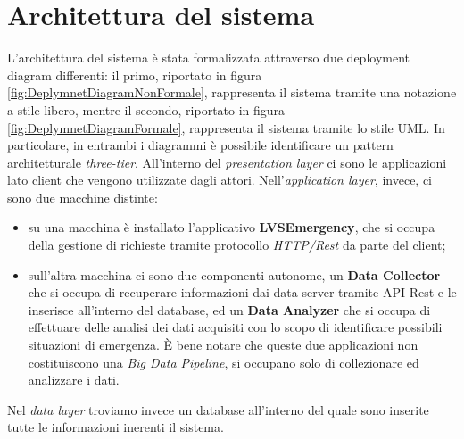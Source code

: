 \clearpage
\section{Architettura del sistema}
L'architettura del sistema è stata formalizzata attraverso due deployment diagram differenti: il primo, riportato in figura \ref{fig:DeplymnetDiagramNonFormale}, rappresenta il sistema tramite una notazione a stile libero, mentre il secondo, riportato in figura \ref{fig:DeplymnetDiagramFormale}, rappresenta il sistema tramite lo stile UML. In particolare, in entrambi i diagrammi è possibile identificare un pattern architetturale \textit{three-tier}. All'interno del \textit{presentation layer} ci sono le applicazioni lato client che vengono utilizzate dagli attori. Nell'\textit{application layer}, invece, ci sono due macchine distinte:

\begin{itemize}
	\item su una macchina è installato l'applicativo \textbf{LVSEmergency}, che si occupa della gestione di richieste tramite protocollo \textit{HTTP/Rest} da parte del client;
	\item sull'altra macchina ci sono due componenti autonome, un \textbf{Data Collector} che si occupa di recuperare informazioni dai data server tramite API Rest e le inserisce all'interno del database, ed un \textbf{Data Analyzer} che si occupa di effettuare delle analisi dei dati acquisiti con lo scopo di identificare possibili situazioni di emergenza. È bene notare che queste due applicazioni non costituiscono una \textit{Big Data Pipeline}, si occupano solo di collezionare ed analizzare i dati.
\end{itemize}

Nel \textit{data layer} troviamo invece un database all'interno del quale sono inserite tutte le informazioni inerenti il sistema.

